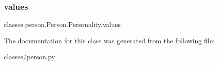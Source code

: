 \subsubsection{\texorpdfstring{values}{values}}
{\footnotesize\ttfamily classes.\+person.\+Person.\+Personality.\+values}



The documentation for this class was generated from the following file\+:\begin{DoxyCompactItemize}
\item 
classes/\hyperlink{person_8py}{person.\+py}\end{DoxyCompactItemize}
